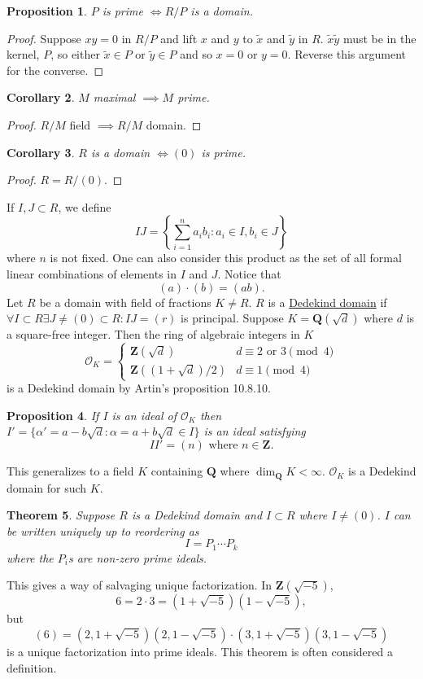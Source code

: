 \documentclass[11pt, oneside]{amsart}
\numberwithin{equation}{section}
\newtheorem{theorem}{Theorem}
\numberwithin{theorem}{section}
\newtheorem{corollary}[theorem]{Corollary}
\newtheorem{proposition}[theorem]{Proposition}
\theoremstyle{definition}
\def\Z{\mathbf{Z}}
\def\Q{\mathbf{Q}}
\def\Or{\mathcal{O}}
\begin{document}
{\begin{proposition}
$P$ is prime $\iff R/P$ is a domain. 
\end{proposition}
\begin{proof}
Suppose $xy=0$ in $R/P$ and lift $x$ and $y$ to $\tilde x$ and $\tilde y$ in $R$. $\tilde x\tilde y$ must be in the kernel, $P$, so either $\tilde x\in P$ or $\tilde y\in P$ and so $x=0$ or $y=0$. Reverse this argument for the converse. 
\end{proof}
\begin{corollary}
$M$ maximal $\implies M$ prime.
\end{corollary}
\begin{proof}
$R/M$ field $\implies R/M$ domain.
\end{proof}
\begin{corollary}
$R$ is a domain $\iff (0)$ is prime.
\end{corollary}
\begin{proof}
$R = R/(0)$.
\end{proof}

If $I,J\subset R$, we define 
$$
IJ =\left\{  \sum_{i=1}^n a_ib_i : a_i\in I, b_i\in J  \right\}
$$
where $n$ is not fixed. One can also consider this product as the set of all formal linear combinations of elements in $I$ and $J$. Notice that
$$
(a)\cdot(b) = (ab).
$$
Let $R$ be a domain with field of fractions $K\neq R$. $R$ is a \underline{Dedekind domain} if $\forall I\subset R\exists J\neq (0)\subset R:IJ=(r)$  is principal. Suppose $K = \Q(\sqrt d)$ where $d$ is a square-free integer. Then the ring of algebraic integers in $K$
$$
\Or_K  = \begin{cases}
      \Z(\sqrt d) & d\equiv 2\textrm{ or } 3\pmod 4 \\
      \Z((1+\sqrt d)/2) & d\equiv 1\pmod 4
    \end{cases}
$$
is a Dedekind domain by Artin's proposition 10.8.10.
\begin{proposition}
If $I$ is an ideal of $\Or_K$ then $I'=\{\alpha ' = a-b\sqrt d : \alpha = a+b\sqrt d \in I\}$ is an ideal satisfying 
$$
II' = (n) \textrm { where } n\in\Z.
$$
\end{proposition}
This generalizes to a field $K$ containing $\Q$ where $\dim _\Q K < \infty$. $\Or_K$ is a Dedekind domain for such $K$. 

\begin{theorem}
Suppose $R$ is a Dedekind domain and $I\subset R$ where $I\neq (0)$. $I$ can be written uniquely up to reordering as 
$$
I = P_1\cdots P_k
$$
where the $P_i$s are non-zero prime ideals. 
\end{theorem}
This gives a way of salvaging unique factorization. In $\Z(\sqrt {-5})$,
$$
6 = 2\cdot 3 = (1+\sqrt{-5})(1-\sqrt{-5}),
$$
but 
$$
(6) = (2, 1+\sqrt{-5})(2, 1-\sqrt{-5})\cdot  (3, 1+\sqrt{-5})(3, 1-\sqrt{-5})
$$
is a unique factorization into prime ideals. This theorem is often considered a definition.

}
\end{document}
